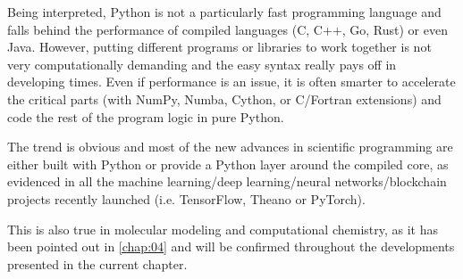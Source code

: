 Being interpreted, Python is not a particularly fast programming language and falls behind the performance of compiled languages (C, C++, Go, Rust) or even Java. However, putting different programs or libraries to work together is not very computationally demanding and the easy syntax really pays off in developing times. Even if performance is an issue, it is often smarter to accelerate the critical parts (with NumPy,\cite{numpy} Numba,\cite{numba} Cython,\cite{cython} or C/Fortran extensions) and code the rest of the program logic in pure Python.

The trend is obvious and most of the new advances in scientific programming are either built with Python or provide a Python layer around the compiled core, as evidenced in all the machine learning/deep learning/neural networks/blockchain projects recently launched (i.e. TensorFlow,\cite{tensorflow} Theano\cite{theano} or PyTorch\cite{pytorch}).

This is also true in molecular modeling and computational chemistry, as it has been pointed out in \autoref{chap:04} and will be confirmed throughout the developments presented in the current chapter.



